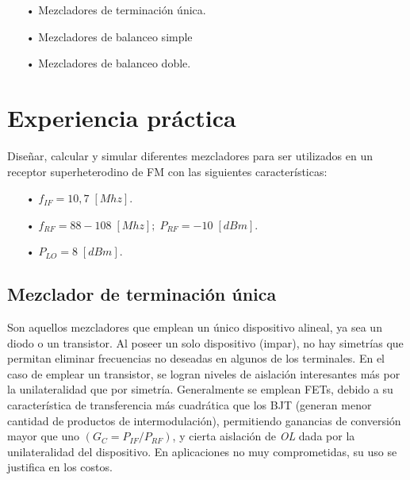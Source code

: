 \documentclass[twocolumn]{article}
\begin{document}
\begin{itemize}\itemsep0em
\item[•]  Mezcladores de terminación única.
\item[•]  Mezcladores de balanceo simple
\item[•]  Mezcladores de balanceo doble.
\end{itemize}

\clearpage

\section{Experiencia práctica}
Diseñar, calcular y simular diferentes mezcladores para ser utilizados en un receptor superheterodino de FM con las siguientes características:

\begin{itemize}\itemsep0em
\item[•]  $f_{IF} = 10,7 \; [Mhz]$.
\item[•]  $f_{RF} = 88-108 \; [Mhz]; \; P_{RF} = -10 \; [dBm]$.
\item[•]  $P_{LO} = 8 \;[dBm]$.
\end{itemize}

\subsection{Mezclador de terminación única}
Son aquellos mezcladores que emplean un único dispositivo alineal, ya sea un diodo o un transistor. Al poseer un solo dispositivo (impar), no hay simetrías que permitan eliminar frecuencias no deseadas en algunos de los terminales. En el caso de emplear un transistor, se logran niveles de aislación interesantes más por la unilateralidad que por simetría. Generalmente se emplean FETs, debido a su característica de transferencia más cuadrática que los BJT (generan menor cantidad de productos de intermodulación), permitiendo ganancias de conversión mayor que uno $(G_C = P_{IF}/P_{RF})$, y cierta aislación de \textit{OL} dada por la unilateralidad del dispositivo. En aplicaciones no muy comprometidas, su uso se justifica en los costos.
\end{document}
